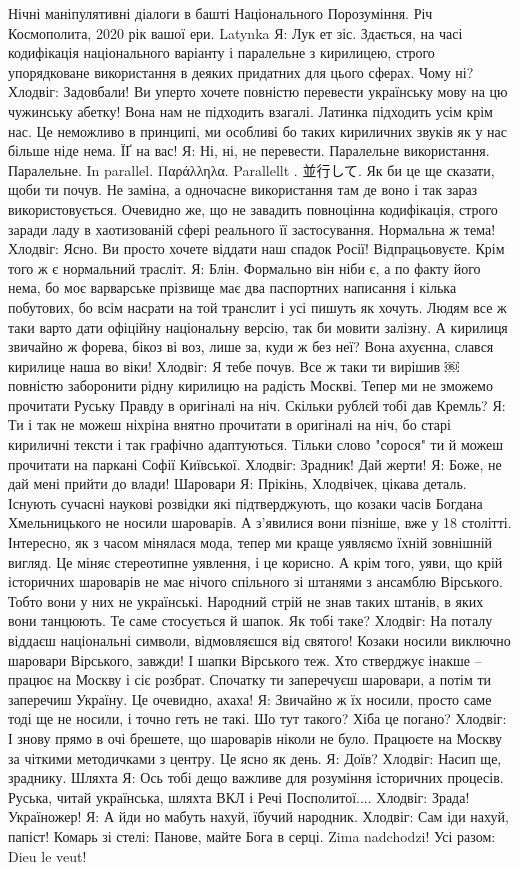 \obeycr
Нічні маніпулятивні діалоги в башті Національного Порозуміння. 
Річ Космополита, 2020 рік вашої ери.
Latynka
Я: Лук ет зіс. Здається, на часі кодифікація національного варіанту і паралельне з кирилицею, строго упорядковане використання в деяких придатних для цього сферах. Чому ні?
Хлодвіг: Задовбали! Ви уперто хочете повністю перевести українську мову на цю чужинську абетку! Вона нам не підходить взагалі. Латинка підходить усім крім нас. Це неможливо в принципі, ми особливі бо таких кириличних звуків як у нас більше ніде нема. ЇҐ на вас!
Я: Ні, ні, не перевести. Паралельне використання. Паралельне. 
In parallel. Παράλληλα. Parallellt . 並行して. Як би це ще сказати, щоби ти почув. Не заміна, а одночасне використання там де воно і так зараз використовується. Очевидно же, що не завадить повноцінна кодифікація, строго заради ладу в хаотизованій сфері реального її застосування. Нормальна ж тема!
Хлодвіг: Ясно. Ви просто хочете віддати наш спадок Росії! Відпрацьовуєте. Крім того ж є нормальний трасліт.
Я: Блін. Формально він ніби є, а по факту його нема, бо моє варварське прізвище має два паспортних написання і кілька побутових, бо всім насрати на той транслит і усі пишуть як хочуть. Людям все ж таки варто дати офіційну національну версію, так би мовити залізну. А кирилиця звичайно ж форева, бікоз ві воз, лише за, куди ж без неї? Вона ахуєнна, слався кирилице наша во віки!
Хлодвіг: Я тебе почув. Все ж таки ти вирішив ￼повністю заборонити рідну кирилицю на радість Москві. Тепер ми не зможемо прочитати Руську Правду в оригіналі на ніч. Скільки рублєй тобі дав Кремль?
Я: Ти і так не можеш ніхріна внятно прочитати в оригіналі на ніч, бо старі кириличні тексти і так графічно адаптуються. Тільки слово "сорося" ти й можеш прочитати на паркані Софії Київської.
Хлодвіг: Зрадник! Дай жерти!
Я: Боже, не дай мені прийти до влади!
Шаровари
Я: Прікінь, Хлодвічек, цікава деталь. Існують сучасні наукові розвідки які підтверджують, що козаки часів Богдана Хмельницького не носили шароварів. А з'явилися вони пізніше, вже у 18 столітті. Інтересно, як з часом мінялася мода, тепер ми краще уявляємо їхній зовнішній вигляд. Це міняє стереотипне уявлення, і це корисно. А крім того, уяви, що крій історичних шароварів не має нічого спільного зі штанями з ансамблю Вірського. Тобто вони у них не українські. Народний стрій не знав таких штанів, в яких вони танцюють. Те саме стосується й шапок. Як тобі таке?
Хлодвіг: На поталу віддаєш національні символи, відмовляєшся від святого! Козаки носили виключно шаровари Вірського, завжди! І шапки Вірського теж. Хто стверджує інакше – працює на Москву і сіє розбрат. Спочатку ти заперечуєш шаровари, а потім ти заперечиш Україну. Це очевидно, ахаха!
Я: Звичайно ж їх носили, просто саме тоді ще не носили, і точно геть не такі. Шо тут такого? Хіба це погано?
Хлодвіг: І знову прямо в очі брешете, що шароварів ніколи не було. Працюєте на Москву за чіткими методичками з центру. Це ясно як день.
Я: Доїв?
Хлодвіг: Насип ще, зраднику.
Шляхта
Я: Ось тобі дещо важливе для розуміння історичних процесів. Руська, читай українська, шляхта ВКЛ і Речі Посполитої....
Хлодвіг: Зрада! Україножер!
Я: А йди но мабуть нахуй, їбучий народник.
Хлодвіг: Сам іди нахуй, папіст! 
Комарь зі стелі: Панове, майте Бога в серці. Zima nadchodzi!
Усі разом: Dieu le veut!
\restorecr
